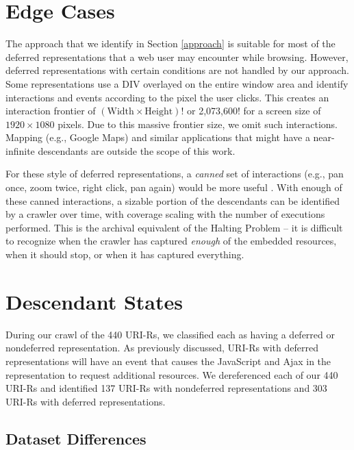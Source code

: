 \documentclass{sig-alternate}
\begin{document}
\section{Edge Cases}
\label{edge}
The approach that we identify in Section \ref{approach} is suitable for most of the deferred representations that a web user may encounter while browsing. However, deferred representations with certain conditions are not handled by our approach. Some representations use a DIV overlayed on the entire window area and identify interactions and events according to the pixel the user clicks. This creates an interaction frontier of 
$(\text{Width} \times \text{Height})!$ or 2,073,600! for a screen size of $1920 \times 1080$ pixels. Due to this massive frontier size, we omit such interactions. Mapping (e.g., Google Maps)  and similar applications that might have a near-infinite descendants are outside the scope of this  work.

For these style of deferred representations, a \emph{canned} set of interactions (e.g., pan once, zoom twice, right click, pan again) would be more useful \cite{seleniumpjs}. With enough of these canned interactions, a sizable portion of the descendants can be identified by a crawler over time, with coverage scaling with the number of executions performed. This is the archival equivalent of the Halting Problem -- it is difficult to recognize when the crawler has captured \emph{enough} of the embedded resources, when it should stop, or when it has captured everything.

\section{Descendant States}
\label{states}
During our crawl of the 440 URI-Rs, we classified each as having a deferred or nondeferred representation. As previously discussed, URI-Rs with deferred representations will have an event that causes the JavaScript and Ajax in the representation to request additional resources. We dereferenced each of our 440 URI-Rs and identified 137 URI-Rs with nondeferred representations and 303 URI-Rs with deferred representations. 

\subsection{Dataset Differences}
\label{diffs}
\end{document}
